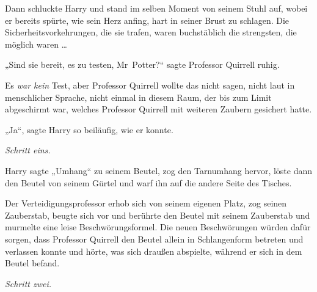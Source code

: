 Dann schluckte Harry und stand im selben Moment von seinem Stuhl auf, wobei er bereits spürte, wie sein Herz anfing, hart in seiner Brust zu schlagen. Die Sicherheitsvorkehrungen, die sie trafen, waren buchstäblich die strengsten, die möglich waren …

„Sind sie bereit, es zu testen, Mr~Potter?“ sagte Professor Quirrell ruhig.

Es \emph{war kein} Test, aber Professor Quirrell wollte das nicht sagen, nicht laut in menschlicher Sprache, nicht einmal in diesem Raum, der bis zum Limit abgeschirmt war, welches Professor Quirrell mit weiteren Zaubern gesichert hatte.

„Ja“, sagte Harry so beiläufig, wie er konnte.

\emph{Schritt eins.}

Harry sagte
„Umhang“ zu seinem Beutel, zog den Tarnumhang hervor, löste dann den Beutel von seinem Gürtel und warf ihn auf die andere Seite des Tisches.

Der Verteidigungsprofessor erhob sich von seinem eigenen Platz, zog seinen Zauberstab, beugte sich vor und berührte den Beutel mit seinem Zauberstab und murmelte eine leise Beschwörungsformel. Die neuen Beschwörungen würden dafür sorgen, dass Professor Quirrell den Beutel allein in Schlangenform betreten und verlassen konnte und hörte, was sich draußen abspielte, während er sich in dem Beutel befand.

\emph{Schritt zwei.}

